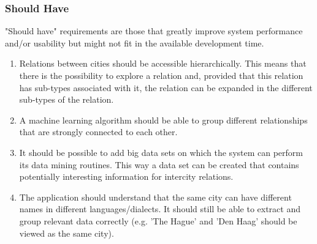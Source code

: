 \subsubsection {Should Have}
"Should have" requirements are those that greatly improve system performance and/or usability but might not fit in the available development time.

\begin{enumerate}
    \item Relations between cities should be accessible hierarchically. This means that there is the possibility to explore a relation and, provided that this relation has sub-types associated with it, the relation can be expanded in the different sub-types of the relation.
    \item A machine learning algorithm should be able to group different relationships that are strongly connected to each other.
    \item It should be possible to add big data sets on which the system can perform its data mining routines. This way a data set can be created that contains potentially interesting information for intercity relations.
    \item The application should understand that the same city can have different names in different languages/dialects. It should still be able to extract and group relevant data correctly (e.g. 'The Hague' and 'Den Haag' should be viewed as the same city).
\end{enumerate}
\iffalse
